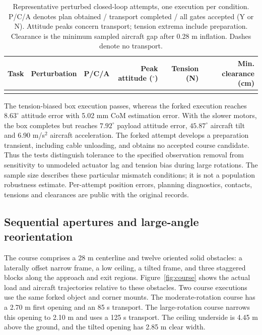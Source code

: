 \begin{table}[t]
\centering\small
\caption{Representative perturbed closed-loop attempts, one execution per condition. P/C/A denotes plan obtained / transport completed / all gates accepted (Y or N). Attitude peaks concern transport; tension extrema include preparation. Clearance is the minimum sampled aircraft gap after 0.28 m inflation. Dashes denote no transport.}
\label{tab:perturbation}
\begin{tabular}{@{}llcrrr@{}}\toprule
Task & Perturbation & P/C/A & Peak attitude ($^\circ$) & Tension (N) & Min. clearance (cm)\\\midrule
\\\bottomrule
\end{tabular}
\end{table}

The tension-biased box execution passes, whereas the forked execution reaches $8.63^\circ$ attitude error with 5.02 mm CoM estimation error. With the slower motors, the box completes but reaches $7.92^\circ$ payload attitude error, $45.87^\circ$ aircraft tilt and 6.90 m/s$^2$ aircraft acceleration. The forked attempt develops a preparation transient, including cable unloading, and obtains no accepted course candidate. Thus the tests distinguish tolerance to the specified observation removal from sensitivity to unmodeled actuator lag and tension bias during large rotations. The sample size describes these particular mismatch conditions; it is not a population robustness estimate. Per-attempt position errors, planning diagnostics, contacts, tensions and clearances are public with the original records.

\subsection{Sequential apertures and large-angle reorientation}
The course comprises a 28 m centerline and twelve oriented solid obstacles: a laterally offset narrow frame, a low ceiling, a tilted frame, and three staggered blocks along the approach and exit regions. Figure~\ref{fig:course} shows the actual load and aircraft trajectories relative to these obstacles. Two course executions use the same forked object and corner mounts. The moderate-rotation course has a 2.70 m first opening and an 85 s transport. The large-rotation course narrows this opening to 2.10 m and uses a 125 s transport. The ceiling underside is 4.45 m above the ground, and the tilted opening has 2.85 m clear width.

